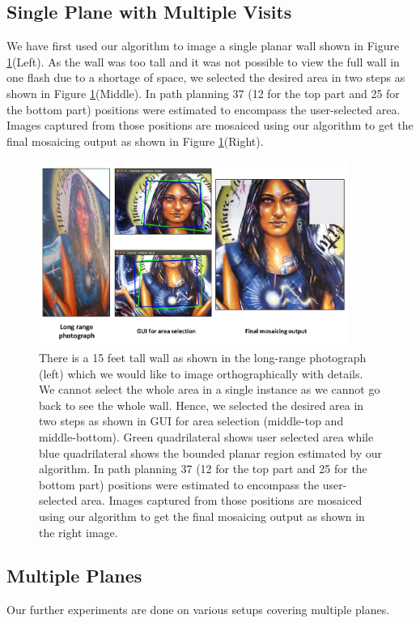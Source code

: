 \subsection{Single Plane with Multiple Visits}
We have first used our algorithm to image a single planar wall shown in
Figure \ref{fig:resultLady}(Left). As the wall was too tall and it was not
possible to view the full wall in one flash due to a shortage of space, we
selected the desired area in two steps as shown in Figure  \ref{fig:resultLady}(Middle). In path planning 37 (12
for the top part and 25 for the bottom part) positions were estimated to
encompass the user-selected area. Images captured from those positions are
mosaiced using our algorithm to get the final mosaicing output as shown in Figure \ref{fig:resultLady}(Right).
\begin{figure}
\centering
\includegraphics[width=0.9\textwidth]{figures/multiplanar/ladyResult.pdf}
\caption{There is a 15 feet tall wall as shown in the long-range photograph
(left) which we would like to image orthographically with details. We cannot
select the whole area in a single instance as we cannot go back to see the whole
wall. Hence, we selected the desired area in two steps as shown in GUI for area
selection (middle-top and middle-bottom). Green quadrilateral shows user selected area
while blue quadrilateral shows the bounded planar region estimated by our
algorithm. In path planning 37 (12 for the top part and 25 for the bottom part) positions were
estimated to encompass the user-selected area. Images captured from those
positions are mosaiced using our algorithm to get the final mosaicing output as shown in the
right image.}
\label{fig:resultLady}
\end{figure}

\subsection{Multiple Planes}
Our further experiments are done on various setups covering multiple planes.\\

